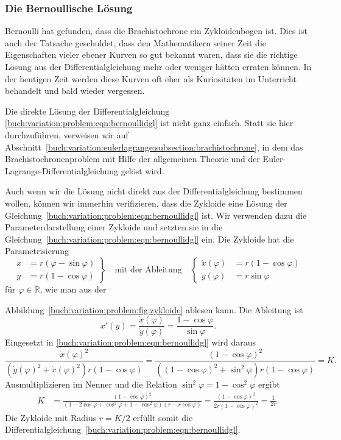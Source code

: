 %
%
\subsubsection{Die Bernoullische Lösung}
Bernoulli hat gefunden, dass die Brachistochrone ein Zykloidenbogen ist.
Dies ist auch der Tatsache geschuldet, dass den Mathematikern seiner
Zeit die Eigenschaften vieler ebener Kurven so gut bekannt waren, dass
sie die richtige Lösung aus der Differentialgleichung mehr oder weniger
hätten erraten können.
In der heutigen Zeit werden diese Kurven oft eher als Kuriositäten
im Unterricht behandelt und bald wieder vergessen.

Die direkte Lösung der Differentialgleichung
\eqref{buch:variation:problem:eqn:bernoullidgl}
ist nicht ganz einfach.
Statt sie hier durchzuführen, verweisen wir auf
Abschnitt~\ref{buch:variation:eulerlagrange:subsection:brachistochrone},
in dem das Brachistochronenproblem mit Hilfe der allgemeinen
Theorie und der Euler-Lagrange-Differentialgleichung gelöst wird.

Auch wenn wir die Lösung nicht direkt aus der Differentialgleichung
bestimmen wollen, können wir immerhin verifizieren, dass die Zykloide
eine Lösung der Gleichung~\eqref{buch:variation:problem:eqn:bernoullidgl}
ist.
Wir verwenden dazu die Parameterdarstellung einer Zykloide und
setzten sie in die Gleichung~\eqref{buch:variation:problem:eqn:bernoullidgl}
ein.
Die Zykloide hat die Parametrisierung
\[
\left.
\begin{aligned}
x &= r(\varphi - \sin\varphi) 
\\
y &= r(1-\cos\varphi)
\end{aligned}
\right\}
\quad
\text{mit der Ableitung}
\quad
\left\{
\begin{aligned}
\dot{x}(\varphi) &= r(1-\cos\varphi)\\
\dot{y}(\varphi) &= r\sin\varphi
\end{aligned}
\right.
\]
für $\varphi\in\mathbb{R}$, wie man aus der

Abbildung~\ref{buch:variation:problem:fig:zykloide} ablesen kann.
Die Ableitung ist
\[
x'(y)
=
\frac{\dot{x}(\varphi)}{\dot{y}(\varphi)}
=
\frac{1-\cos\varphi}{\sin\varphi}.
\]
Eingesetzt in \eqref{buch:variation:problem:eqn:bernoullidgl}
wird daraus
\[
\frac{\dot{x}(\varphi)^2}{
(\dot{y}(\varphi)^2 +\dot{x}(\varphi)^2)
r(1-\cos\varphi)
}
=
\frac{(1-\cos\varphi)^2}{
((1-\cos\varphi)^2+\sin^2\varphi)
r
(1-\cos\varphi)
}
=
K.
\]
Ausmultiplizieren im Nenner und die Relation $\sin^2\varphi=1-\cos^2\varphi$
ergibt
\begin{align*}
K
&=
\frac{(1-\cos\varphi)^2}{
(1-2\cos\varphi+\cos^2\varphi+1-\cos^2\varphi)
(r-r\cos\varphi)
}
=
\frac{(1-\cos\varphi)^2}{2r(1-\cos\varphi)^2}
=
\frac{1}{2r}.
\end{align*}
Die Zykloide mit Radius $r=K/2$ erfüllt somit die
Differentialgleichung~\eqref{buch:variation:problem:eqn:bernoullidgl}.

